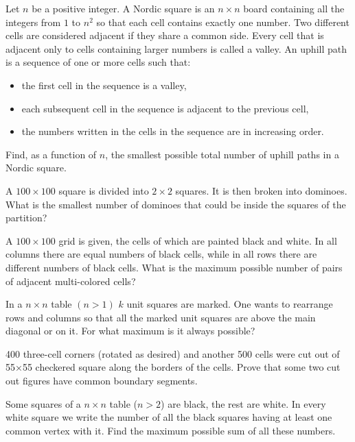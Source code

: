 \begin{problem}[ISL 2022]
    Let $n$ be a positive integer. A Nordic square is an $n \times n$ board containing all the integers from $1$ to $n^2$ so that each cell contains exactly one number. Two different cells are considered adjacent if they share a common side. Every cell that is adjacent only to cells containing larger numbers is called a valley. An uphill path is a sequence of one or more cells such that:
    \begin{itemize}
        \item the first cell in the sequence is a valley,
        \item each subsequent cell in the sequence is adjacent to the previous cell,
        \item the numbers written in the cells in the sequence are in increasing order.
    \end{itemize}
    Find, as a function of $n$, the smallest possible total number of uphill paths in a Nordic square.
\end{problem}

\begin{problem}
    A $100\times 100$ square is divided into $2\times 2$ squares. It is then broken into dominoes. What is the smallest number of dominoes that could be inside the squares of the partition?
\end{problem}

\begin{problem}
    A $100\times 100$ grid is given, the cells of which are painted black and white. In all columns there are equal numbers of black cells, while in all rows there are different numbers of black cells. What is the maximum possible number of pairs of adjacent multi-colored cells?
\end{problem}

\begin{problem}[Tuymaada 2021]
    In a $n\times n$ table $(n>1)$ $k$ unit squares are marked. One wants to rearrange rows and columns so that all the marked unit squares are above the main diagonal or on it. For what maximum  is it always possible?
\end{problem}

\begin{problem}
    400 three-cell corners (rotated as desired) and another 500 cells were cut out of 55×55 checkered square along the borders of the cells.
    Prove that some two cut out figures have common boundary segments.
\end{problem}

\begin{problem}[IZhO 2020]
    Some squares of a $n \times n$ table ($n>2$) are black, the rest are white. In every white square we write the number of all the black squares having at least one common vertex with it. Find the maximum possible sum of all these numbers.
\end{problem}

